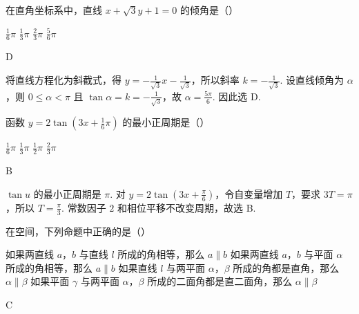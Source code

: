 \documentclass[UTF8,a4paper,oneside,11pt]{ctexbook}
\begin{document}
\begin{problem}

在直角坐标系中，直线 \(x + \sqrt{3} y + 1 = 0\) 的倾角是（\quad）

\choices
    {\(\frac{1}{6}\pi\)}
    {\(\frac{1}{3}\pi\)}
    {\(\frac{2}{3}\pi\)}
    {\(\frac{5}{6}\pi\)}
\end{problem}

\begin{answer}
D
\end{answer}

\begin{solution}
将直线方程化为斜截式，得 \(y=-\frac{1}{\sqrt{3}}x-\frac{1}{\sqrt{3}}\)，所以斜率 \(k=-\frac{1}{\sqrt{3}}\). 设直线倾角为 \(\alpha\)，则 \(0\leqslant\alpha<\pi\) 且 \(\tan\alpha=k=-\frac{1}{\sqrt{3}}\)，故 \(\alpha=\frac{5\pi}{6}\). 因此选 D.
\end{solution}

\begin{problem}

函数 \(y = 2\tan\left( 3x + \frac{1}{6}\pi \right) \) 的最小正周期是（\quad）

\choices
    {\(\frac{1}{6}\pi\)}
    {\(\frac{1}{3}\pi\)}
    {\(\frac{1}{2}\pi\)}
    {\(\frac{2}{3}\pi\)}
\end{problem}

\begin{answer}
B
\end{answer}

\begin{solution}
\(\tan u\) 的最小正周期是 \(\pi\). 对 \(y=2\tan\left(3x+\frac{\pi}{6}\right)\)，令自变量增加 \(T\)，要求 \(3T=\pi\)，所以 \(T=\frac{\pi}{3}\). 常数因子 \(2\) 和相位平移不改变周期，故选 B.
\end{solution}

\begin{problem}

在空间，下列命题中正确的是（\quad）

\choices
    {如果两直线 \(a\)，\(b\) 与直线 \(l\) 所成的角相等，那么 \(a\parallel b\)}
    {如果两直线 \(a\)，\(b\) 与平面 \(\alpha\) 所成的角相等，那么 \(a\parallel b\)}
    {如果直线 \(l\) 与两平面 \(\alpha\)，\(\beta\) 所成的角都是直角，那么 \(\alpha\parallel\beta\)}
    {如果平面 \(\gamma\) 与两平面 \(\alpha\)，\(\beta\) 所成的二面角都是直二面角，那么 \(\alpha\parallel\beta\)}
\end{problem}

\begin{answer}
C
\end{answer}
\end{document}
